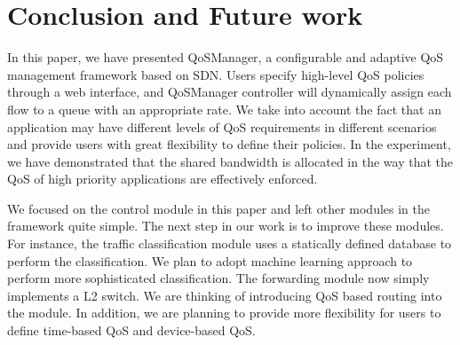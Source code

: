 \section{Conclusion and Future work}
\label{sect:future}

In this paper, we have presented QoSManager, a configurable and adaptive QoS management framework
based on SDN. Users specify high-level QoS policies through a web interface, and QoSManager controller
will dynamically assign each flow to a queue with an appropriate rate. We take into account the fact
that an application may have different levels of QoS requirements in different scenarios and provide
users with great flexibility to define their policies. In the experiment, we have demonstrated that
the shared bandwidth is allocated in the way that the QoS of high priority applications are effectively
enforced.

We focused on the control module in this paper and left other modules in the framework quite simple.
The next step in our work is to improve these modules. For instance, the traffic classification module
uses a statically defined database to perform the classification. We plan to adopt machine learning
approach  to perform more sophisticated classification. The forwarding module now simply implements a L2
switch. We are thinking of introducing QoS based routing \cite{Apostolopoulos_SIGCOMM98, Egilmez_ASPIPA12}
into the module. In addition, we are planning to provide more flexibility for users to define time-based
QoS and device-based QoS.
